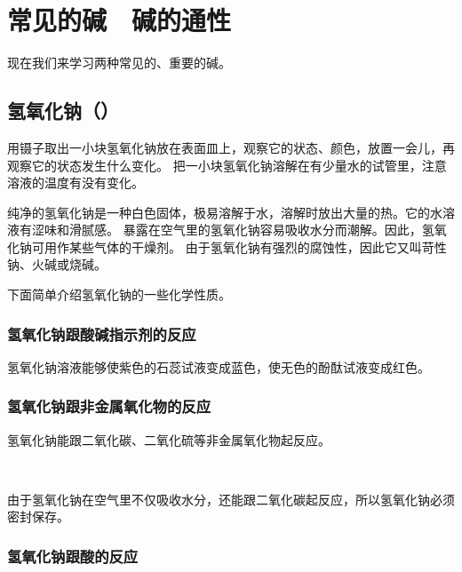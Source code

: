\section{常见的碱　碱的通性}\label{sec:5-5}

现在我们来学习两种常见的、重要的碱。

\subsection{氢氧化钠（）}

\begin{shiyan}
    用镊子取出一小块氢氧化钠放在表面皿上，观察它的状态、颜色，放置一会儿，再观察它的状态发生什么变化。
    把一小块氢氧化钠溶解在有少量水的试管里，注意溶液的温度有没有变化。
\end{shiyan}

纯净的氢氧化钠是一种白色固体，极易溶解于水，溶解时放出大量的热。它的水溶液有涩味和滑腻感。
暴露在空气里的氢氧化钠容易吸收水分而潮解。因此，氢氧化钠可用作某些气体的干燥剂。
由于氢氧化钠有强烈的腐蚀性，因此它又叫苛性钠、火碱或烧碱。

下面简单介绍氢氧化钠的一些化学性质。

\subsubsection{氢氧化钠跟酸碱指示剂的反应}

氢氧化钠溶液能够使紫色的石蕊试液变成蓝色，使无色的酚酞试液变成红色。


\subsubsection{氢氧化钠跟非金属氧化物的反应}

氢氧化钠能跟二氧化碳、二氧化硫等非金属氧化物起反应。
\begin{fangchengshi}
     \\
\end{fangchengshi}

由于氢氧化钠在空气里不仅吸收水分，还能跟二氧化碳起反应，所以氢氧化钠必须密封保存。

\subsubsection{氢氧化钠跟酸的反应}

